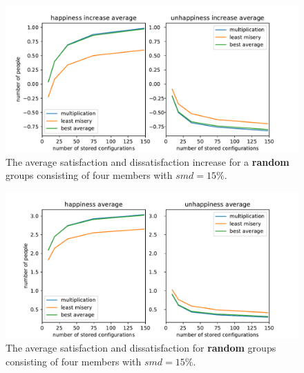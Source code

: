 \begin{figure}
    \centering
    \includegraphics[width=1\textwidth]{./figures/60_evaluation/random_happy_unhappy_increase_amount-1000_smd-15.pdf}
    \caption{The average satisfaction and dissatisfaction increase for a \textbf{random} groups consisting of four members with $smd=15\%$.}
    \label{fig:Evaluation:RandomGroupIncrease}
\end{figure}

\begin{figure}
    \centering
    \includegraphics[width=1\textwidth]{./figures/60_evaluation/random_happy_unhappy_total_group_amount-1000_smd-15.pdf}
    \caption{The average satisfaction and dissatisfaction for \textbf{random} groups consisting of four members with $smd=15\%$.}
    \label{fig:Evaluation:RandomGroupTotal}
\end{figure}

